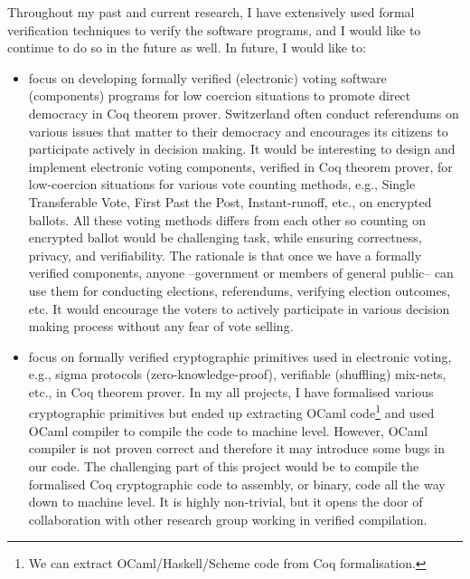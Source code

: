 \documentclass[a4paper]{article}
\begin{document}
Throughout my past and current research, I have extensively used formal verification techniques 
to verify the software programs, and I would like to continue to do so in the future as well. 
In future, I would like to:

\begin{itemize}

\item focus on developing formally verified (electronic) voting software (components) programs 
for low coercion situations to promote direct democracy in Coq theorem prover. Switzerland often 
conduct referendums on various issues that matter to their democracy and encourages its citizens 
to participate actively in decision making. It would be interesting to design and 
implement electronic voting components, verified in Coq theorem prover, for low-coercion 
situations for various vote counting methods, e.g., Single Transferable Vote, First Past the Post, 
Instant-runoff, etc., on encrypted ballots. All these voting methods 
differs from each other so counting on encrypted ballot would be challenging task, while 
ensuring correctness, privacy, and verifiability.  
The rationale is that once we have a formally verified components, anyone --government or 
members of general public-- can use them for conducting elections, referendums, 
verifying election outcomes, etc. It would  encourage the voters to 
actively participate in various decision making process without any fear of vote selling.

\item focus on formally verified cryptographic primitives used in electronic voting, e.g., 
	sigma protocols (zero-knowledge-proof), verifiable (shuffling) mix-nets, etc., in Coq theorem prover. 
	In my all projects, I have formalised various 
	cryptographic primitives but ended up extracting OCaml code\footnote{We can extract OCaml/Haskell/Scheme 
	code from Coq formalisation.} and used OCaml compiler to 
	compile the code to machine level. However, OCaml compiler is not proven correct 
	and therefore it may introduce some bugs in our code. The challenging part of this project would be 
	to compile the formalised Coq cryptographic code to assembly, or binary, code all the way 
	down to machine level. It is highly non-trivial, but it opens the door of 
	collaboration with other research group working in verified compilation.


\end{itemize}
\end{document}
